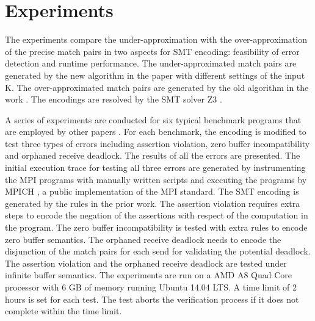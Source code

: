 \section{Experiments}
The experiments compare the under-approximation with the over-approximation of the precise match pairs in two aspects for SMT encoding: feasibility of error detection and runtime performance. The under-approximated match pairs are generated by the new algorithm in the paper with different settings of the input K. The over-approximated match pairs are generated by the old algorithm in the work \cite{DBLP:conf/kbse/HuangMM13}. The encodings are resolved by the SMT solver Z3 \cite{demoura:tacas08}. 

A series of experiments are conducted for six typical benchmark programs that are employed by other papers \cite{benchmark:fevs,mpptest_benchmark,DBLP:conf/kbse/HuangMM13,HuangDeadlock,DBLP:conf/ppopp/XueLWGCZZV09}. For each benchmark, the encoding is modified to test three types of errors including assertion violation, zero buffer incompatibility and orphaned receive deadlock. The results of all the errors are presented. The initial execution trace for testing all three errors are generated by instrumenting the MPI programs with manually written scripts and executing the programs by MPICH \cite{mpich}, a public implementation of the MPI standard. The SMT encoding is generated by the rules in the prior work.
The assertion violation requires extra steps to encode the negation of the assertions with respect of the computation in the program. The zero buffer incompatibility is tested with extra rules to encode zero buffer semantics. The orphaned receive deadlock needs to encode the disjunction of the match pairs for each send for validating the potential deadlock. The assertion violation and the orphaned receive deadlock are tested under infinite buffer semantics. 
The experiments are run on a AMD A8 Quad Core processor with 6 GB of memory running Ubuntu 14.04 LTS. A time limit of 2 hours is set for each test. The test aborts the verification process if it does not complete within the time limit.

